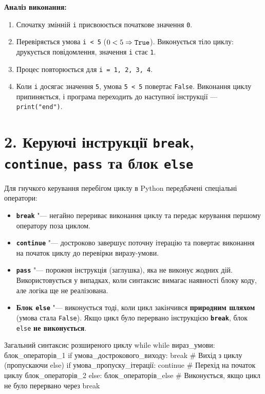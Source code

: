 \documentclass{scrreprt}
\begin{document}
	\textbf{Аналіз виконання:}
	\begin{enumerate}[label=\arabic*.]
		\item Спочатку змінній \texttt{i} присвоюється початкове значення \texttt{0}.
		\item Перевіряється умова \texttt{i < 5} ($0 < 5 \Rightarrow \text{\texttt{True}}$). Виконується тіло циклу: друкується повідомлення, значення \texttt{i} стає \texttt{1}.
		\item Процес повторюється для \texttt{i = 1, 2, 3, 4}.
		\item Коли \texttt{i} досягає значення \texttt{5}, умова \texttt{5 < 5} повертає \texttt{False}. Виконання циклу припиняється, і програма переходить до наступної інструкції — \texttt{print("end")}.
	\end{enumerate}
	
	\newpage
	
	\section*{2. Керуючі інструкції \texttt{break}, \texttt{continue}, \texttt{pass} та блок \texttt{else}}
	
	Для гнучкого керування перебігом циклу в Python передбачені спеціальні оператори:
	
	\begin{itemize}
		\item \textbf{\texttt{break}} "--- негайно перериває виконання циклу та передає керування першому оператору поза циклом.
		\item \textbf{\texttt{continue}} "--- достроково завершує поточну ітерацію та повертає виконання на початок циклу до перевірки виразу-умови.
		\item \textbf{\texttt{pass}} "--- порожня інструкція (заглушка), яка не виконує жодних дій. Використовується у випадках, коли синтаксис вимагає наявності блоку коду, але логіка ще не реалізована.
		\item \textbf{Блок \texttt{else}} "--- виконується тоді, коли цикл закінчився \textbf{природним шляхом} (умова стала \texttt{False}). Якщо цикл було перервано інструкцією \textbf{\texttt{break}}, блок \texttt{else} \textbf{не виконується}.
	\end{itemize}
	
	\begin{pydef}
Загальний синтаксис розширеного циклу while
while вираз_умови:
    блок_операторів_1
    if умова_дострокового_виходу:
        break       # Вихід з циклу (пропускаючи else)
    if умова_пропуску_ітерації:
        continue    # Перехід на початок циклу
    блок_операторів_2
else:
    блок_операторів_else  # Виконується, якщо цикл не було перервано через break
	\end{pydef}
	
\end{document}
